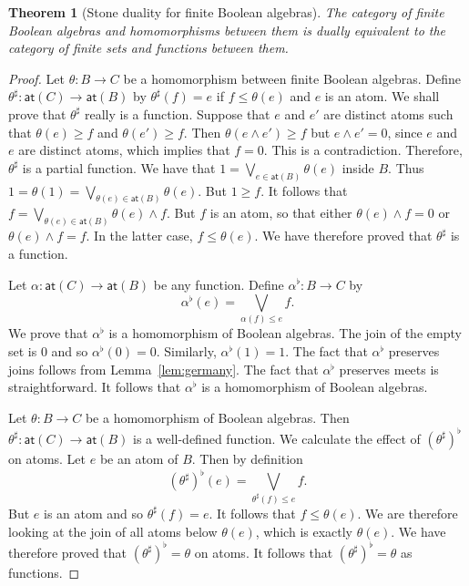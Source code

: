 \documentclass[a4paper]{amsart}
\newtheorem{theorem}{Theorem}[section]
\begin{document}
\begin{theorem}[Stone duality for finite Boolean algebras]\label{them:finite-duality} 
The category of finite Boolean algebras and homomorphisms between them
is dually equivalent to the category of finite sets and functions between them. 
\end{theorem}
\begin{proof}

Let $\theta \colon B \rightarrow C$ be a homomorphism between finite Boolean algebras.
Define $\theta^{\sharp} \colon \mathsf{at}(C) \rightarrow \mathsf{at}(B)$ by
$\theta^{\sharp}(f) = e$ if $f \leq \theta (e)$ and $e$ is an atom.
We shall prove that $\theta^{\sharp}$ really is a function.
Suppose that $e$ and $e'$ are distinct atoms such that $\theta (e) \geq f$ and $\theta (e') \geq f$.
Then $\theta (e \wedge e') \geq f$ but $e \wedge e' = 0$, since $e$ and $e$ are distinct atoms, which implies that $f = 0$.
This is a contradiction.
Therefore, $\theta^{\sharp}$ is a partial function.
We have that $1 = \bigvee_{e \in \mathsf{at}(B)} \theta (e)$ inside $B$.
Thus $1 = \theta (1) =  \bigvee_{\theta (e) \in \mathsf{at}(B)} \theta (e)$.
But $1 \geq f$.
It follows that $f =  \bigvee_{\theta (e) \in \mathsf{at}(B)} \theta (e) \wedge f$.
But $f$ is an atom, so that either $\theta (e) \wedge f = 0$ or $\theta (e) \wedge f = f$.
In the latter case, $f \leq \theta (e)$.
We have therefore proved that $\theta^{\sharp}$ is a function.

Let $\alpha \colon \mathsf{at}(C) \rightarrow \mathsf{at}(B)$ be any function.
Define $\alpha^{\flat} \colon B \rightarrow C$ by
$$\alpha^{\flat}(e) = \bigvee_{\alpha (f) \leq e} f.$$
We prove that $\alpha^{\flat}$ is a homomorphism of Boolean algebras.
The join of the empty set is $0$ and so $\alpha^{\flat}(0) = 0$.
Similarly, $\alpha^{\flat}(1) = 1$.
The fact that $\alpha^{\flat}$ preserves joins follows from  Lemma~\ref{lem:germany}.
The fact that $\alpha^{\flat}$ preserves meets is straightforward.
It follows that $\alpha^{\flat}$ is a homomorphism of Boolean algebras.

Let $\theta \colon B \rightarrow C$ be a homomorphism of Boolean algebras.
Then $\theta^{\sharp} \colon \mathsf{at}(C) \rightarrow \mathsf{at}(B)$ is a well-defined function.
We calculate the effect of $(\theta^{\sharp})^{\flat}$ on atoms.
Let $e$ be an atom of $B$.
Then by definition
$$(\theta^{\sharp})^{\flat}(e) = \bigvee_{\theta^{\sharp} (f) \leq e} f.$$
But $e$ is an atom and so $\theta^{\sharp}(f) = e$.
It follows that $f \leq \theta (e)$.
We are therefore looking at the join of all atoms below $\theta (e)$, which is exactly $\theta (e)$.
We have therefore proved that $(\theta^{\sharp})^{\flat} = \theta$ on atoms.
It follows that $(\theta^{\sharp})^{\flat} = \theta$ as functions.


\end{proof}
\end{document}
